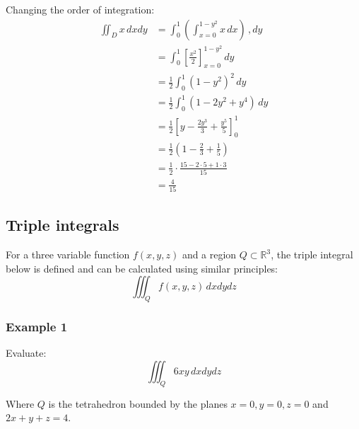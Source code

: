 \documentclass[11pt]{article}
\begin{document}
Changing the order of integration:
\begin{align*}
\iint_D x \, dx dy &= \int_0^1 \left( \int_{x = 0}^{1 - y^2} x \, dx \right) \,, dy \\
&= \int_0^1 \left[\frac{x^2}{2} \right]_{x = 0}^{1 - y^2} \, dy \\
&= \frac{1}{2} \int_0^1 (1 - y^2)^2 \, dy \\
&= \frac{1}{2} \int_0^1 (1 - 2y^2 + y^4) \, dy \\
&= \frac{1}{2} \left[y - \frac{2y^3}{3} + \frac{y^5}{5} \right]_0^1 \\
&= \frac{1}{2} \left(1 - \frac{2}{3} + \frac{1}{5} \right) \\
&= \frac{1}{2} \cdot \frac{15 - 2 \cdot 5 + 1 \cdot 3}{15} \\
&= \frac{4}{15}
\end{align*}
\subsection{Triple integrals}
\label{sec:org4897094}
For a three variable function \(f(x, y, z)\) and a region \(Q \subset \mathbb{R}^3\), the triple integral below is defined and can be calculated using similar principles:
\[\iiint_Q f(x, y, z) \, dx dy dz\]
\subsubsection{Example 1}
\label{sec:org3620207}
Evaluate:
\[\iiint_Q 6xy \, dx dy dz\]

Where \(Q\) is the tetrahedron bounded by the planes \(x = 0, y = 0, z= 0\) and \(2x + y + z = 4\).
\end{document}
